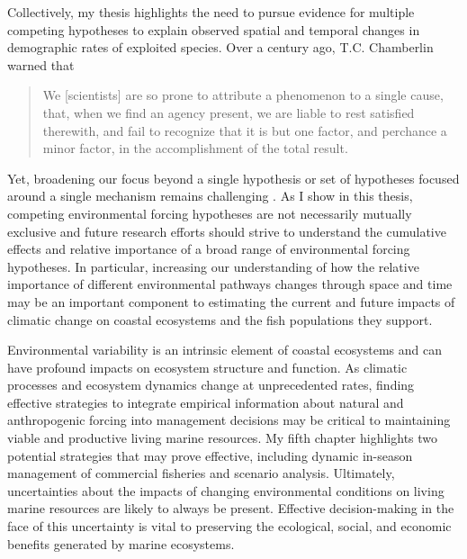 Collectively, my thesis highlights the need to pursue evidence for multiple
competing hypotheses to explain observed spatial and temporal changes in
demographic rates of exploited species. Over a century ago, T.C. Chamberlin
warned that
\begin{quote}
  We [scientists] are so prone to attribute a phenomenon to a single
  cause, that, when we find an agency present, we are liable to rest satisfied
  therewith, and fail to recognize that it is but one factor, and perchance a
  minor factor, in the accomplishment of the total result.
  \citep[p. 756]{Chamberlin1965}
\end{quote}
Yet, broadening our focus beyond a single hypothesis or set of hypotheses
focused around a single mechanism remains challenging \citep{Hare2014}. As I
show in this thesis, competing environmental forcing hypotheses are not
necessarily mutually exclusive and future research efforts should strive to
understand the cumulative effects and relative importance of a broad range of
environmental forcing hypotheses. In particular, increasing our understanding of
how the relative importance of different environmental pathways changes through
space and time may be an important component to estimating the current and
future impacts of climatic change on coastal ecosystems and the fish populations
they support.

Environmental variability is an intrinsic element of coastal ecosystems and can
have profound impacts on ecosystem structure and function. As climatic processes
and ecosystem dynamics change at unprecedented rates, finding effective
strategies to integrate empirical information about natural and anthropogenic
forcing into management decisions may be critical to maintaining viable and
productive living marine resources. My fifth chapter highlights two potential
strategies that may prove effective, including dynamic in-season management of
commercial fisheries and scenario analysis. Ultimately, uncertainties about the
impacts of changing environmental conditions on living marine resources are
likely to always be present. Effective decision-making in the face of this
uncertainty is vital to preserving the ecological, social, and economic benefits
generated by marine ecosystems.


